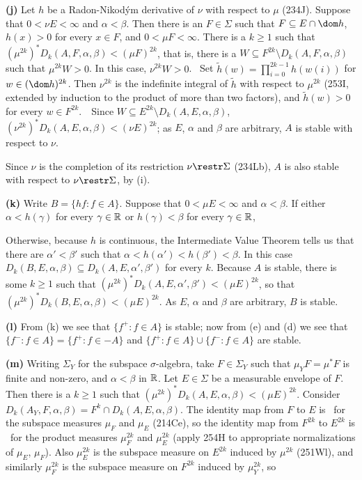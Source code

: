 {\medskip

{\bf (j)} Let $h$ be a Radon-Nikod\'ym derivative of $\nu$ with respect
to $\mu$ (234J).
Suppose that $0<\nu E<\infty$ and $\alpha<\beta$.
Then there is an $F\in\Sigma$ such that $F\subseteq E\cap\dom h$,
$h(x)>0$ for every $x\in F$, and $0<\mu F<\infty$.   There is a $k\ge 1$
such that $(\mu^{2k})^*D_k(A,F,\alpha,\beta)<(\mu F)^{2k}$, that is,
there is a $W\subseteq F^{2k}\setminus D_k(A,F,\alpha,\beta)$ such that
$\mu^{2k}W>0$.   In this case, $\nu^{2k}W>0$.   \Prf\ Set
$\tilde h(w)=\prod_{i=0}^{2k-1}h(w(i))$ for $w\in(\dom h)^{2k}$.   Then
$\nu^{2k}$ is
the indefinite integral of $\tilde h$ with respect to $\mu^{2k}$
(253I, extended by induction to the product of more than two factors),
and $\tilde h(w)>0$ for every $w\in F^{2k}$.\ \QeD\
Since $W\subseteq E^{2k}\setminus D_k(A,E,\alpha,\beta)$,
$(\nu^{2k})^*D_k(A,E,\alpha,\beta)<(\nu E)^{2k}$;  as $E$, $\alpha$ and
$\beta$ are arbitrary, $A$ is stable with respect to $\nu$.

Since $\nu$ is the completion of its restriction $\nu\restr\Sigma$
(234Lb\formerly{2{}34D}),
$A$ is also stable with respect to $\nu\restr\Sigma$, by (i).

\medskip

{\bf (k)} Write $B=\{hf:f\in A\}$.   Suppose that $0<\mu E<\infty$ and
$\alpha<\beta$.   If either $\alpha<h(\gamma)$ for every $\gamma\in\Bbb
R$ or $h(\gamma)<\beta$ for every $\gamma\in\Bbb R$,


\noindent Otherwise, because $h$ is continuous, the Intermediate Value
Theorem tells us that there are $\alpha'<\beta'$ such that
$\alpha<h(\alpha')<h(\beta')<\beta$.   In this case
$D_k(B,E,\alpha,\beta)\subseteq D_k(A,E,\alpha',\beta')$ for every $k$.
Because $A$ is stable, there is some $k\ge 1$ such that
$(\mu^{2k})^*D_k(A,E,\alpha',\beta')<(\mu E)^{2k}$, so that
$(\mu^{2k})^*D_k(B,E,\alpha,\beta)<(\mu E)^{2k}$.  As $E$, $\alpha$ and
$\beta$ are arbitrary, $B$ is stable.

\medskip

{\bf (l)} From (k) we see that $\{f^+:f\in A\}$ is stable;   now from
(e) and (d) we see that $\{f^-:f\in A\}=\{f^+:f\in -A\}$ and
$\{f^+:f\in A\}\cup\{f^-:f\in A\}$ are stable.

\medskip

{\bf (m)} Writing $\Sigma_Y$ for the subspace $\sigma$-algebra, take
$F\in\Sigma_Y$ such that $\mu_YF=\mu^*F$ is finite and non-zero, and
$\alpha<\beta$ in $\Bbb R$.   Let $E\in\Sigma$ be a measurable envelope of
$F$.   Then there is a $k\ge 1$ such that
$(\mu^{2k})^*D_k(A,E,\alpha,\beta)<(\mu E)^{2k}$.   Consider
$D_k(A_Y,F,\alpha,\beta)=F^k\cap D_k(A,E,\alpha,\beta)$.   The identity map
from $F$ to $E$ is \imp\ for the subspace measures $\mu_F$ and $\mu_E$
(214Ce),
so the identity map from $F^{2k}$ to $E^{2k}$ is \imp\ for the product
measures $\mu_F^{2k}$ and $\mu_E^{2k}$ (apply 254H to
appropriate normalizations of
$\mu_E$, $\mu_F$).   Also  $\mu_E^{2k}$ is the subspace measure on $E^{2k}$
induced by $\mu^{2k}$ (251Wl), and similarly $\mu_F^{2k}$ is the subspace
measure on $F^{2k}$ induced by $\mu_Y^{2k}$, so

}
